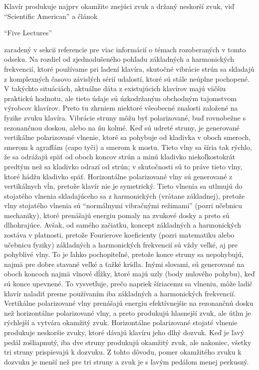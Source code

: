 Klavír produkuje najprv okamžite znejúci zvuk a držaný neskorší zvuk, viď “Scientific American” a článok \begin{english}“Five Lectures”\end{english} zaradený v sekcii referencie pre viac informácií o témach rozoberaných v tomto odseku. Na rozdiel od zjednodušeného pohľadu základných a harmonických frekvencií, ktoré používame pri ladení klavíra, skutočné vibrácie strún sa skladajú z komplexných časovo závislých sérií udalostí, ktoré sú stále neúplne pochopené. V takýchto situáciách, aktuálne dáta z existujúcich klavírov majú väčšiu praktickú hodnotu, ale tieto údaje sú úzkodržaným obchodným tajomstvom výrobcov klavírov. Preto tu zhrniem niektoré všeobecné znalosti založené na fyzike zvuku klavíra. Vibrácie struny môžu byť polarizované, buď rovnobežne s rezonančnou doskou, alebo na ňu kolmé. Keď sú udreté struny, je generované vertikálne polarizované vlnenie, ktoré sa pohybuje od kladivka v oboch smeroch, smerom k agraffám (capo tyči) a smerom k mostu. Tieto vlny sa šíria tak rýchlo, že sa odrážajú späť od oboch koncov strún a minú kladivko niekoľkostokrát predtým než sa kladivko odrazí od strún; v skutočnosti sú to práve tieto vlny, ktoré hádžu kladivko späť. Horizontálne polarizované vlny sú generované z vertikálnych vĺn, pretože klavír nie je symetrický. Tieto vlnenia sa utlmujú do stojatého vlnenia skladajúceho sa z harmonických (vrátane základnej), pretože vlny stojatého vlnenia sú “normálnymi vibračnými režimami” (pozri učebnicu mechaniky), ktoré prenášajú energiu pomaly na zvukové dosky a preto sú dlhohrajúce. Avšak, od samého začiatku, koncept základných a harmonických zostáva v platnosti, pretože Fourierove koeficienty (pozri matematiku alebo učebnicu fyziky) základných a harmonických frekvencií sú vždy veľké, aj pre pohyblivé vlny. To je ľahko pochopiteľné, pretože konce struny sa nepohybujú, najmä pre dobre stavané veľké a ťažké krídla. Inými slovami, sú generované na oboch koncoch najmä vlnové dĺžky, ktoré majú uzly (body nulového pohybu), keď sú konce upevnené. To vysvetľuje, prečo napriek šíriacemu sa vlneniu, môže ladič klavír naladiť presne používaním iba základných a harmonických frekvencií. Vertikálne polarizované vlny prenášajú energiu efektívnejšie na rezonančnú dosku než horizontálne polarizované vlny, a preto produkujú hlasnejší zvuk, ale útlm je rýchlejší a vytvára  okamžitý zvuk. Horizontálne polarizované stojaté vlnenie produkuje neskoršie zvuky, ktoré dávajú klavíru jeho dlhý dozvuk. Keď je ľavý pedál zošliapnutý, iba dve struny produkujú okamžitý zvuk, ale nakoniec, všetky tri struny prispievajú k dozvuku. Z tohto dôvodu, pomer okamžitého zvuku k dozvuku je menší než pre tri struny a zvuk je s ľavým pedálom menej perkusný.

